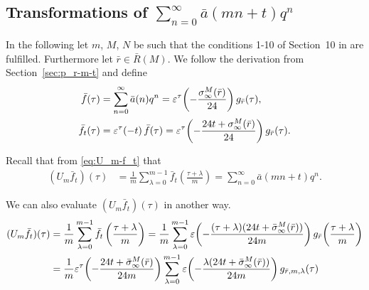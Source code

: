 \documentclass{article}
\begin{document}
\subsection{Transformations of $\sum_{n=0}^\infty \bar{a}(mn+t) q^n$}
\label{sec:p_rbar-m-t}

In the following let $m$, $M$, $N$ be such that the conditions 1-10 of
Section~10 in
\cite{ChenDuZhao_FindingModularFunctionsRamanujan_2019} are
fulfilled.
Furthermore let $\bar{r}\in\bar{R}(M)$.
%
We follow the derivation from Section~\ref{sec:p_r-m-t} and
define
\begin{align*}
  \bar{f}(\tau)
  &=
  \sum_{n=0}^\infty \bar{a}(n) q^n
    =
    \unityPowerTau{-\frac{\sigmainfty[M]{\bar{r}}}{24}} g_{\bar{r}}(\tau),
  \\
  \bar{f}_t(\tau)
  &=
    \unityPowerTau{- t} \bar{f}(\tau)
    =
    \unityPowerTau{-\frac{24t + \sigmainfty[M]{\bar{r}}}{24}} g_{\bar{r}}(\tau).
\end{align*}

Recall that from \eqref{eq:U_m-f_t} that
\begin{align}
  (U_m\bar{f}_t)(\tau)
  &=
  \frac{1}{m} \sum_{\lambda=0}^{m-1}\bar{f}_t\left(\frac{\tau+\lambda}{m}\right)
  =
    \sum_{n=0}^\infty \bar{a}(mn+t) q^n.
  \label{eq:U_m-fbar_t}
\end{align}

We can also evaluate $(U_m\bar{f}_t)(\tau)$ in another way.
%
\begin{align*}
  (U_m\bar{f}_t)(\tau)
  &=
  \frac{1}{m} \sum_{\lambda=0}^{m-1}\bar{f}_t\left(\frac{\tau+\lambda}{m}\right)
    =
    \frac{1}{m} \sum_{\lambda=0}^{m-1}
    \unityPower{-\frac{(\tau+\lambda) (24 t + \sigmainftybar[M]{\bar{r}})}{24 m}}
    g_{\bar{r}}\!\left(\frac{\tau+\lambda}{m}\right)
  \\
  &=
  \frac{1}{m}
  \unityPowerTau{-\frac{24t+\sigmainftybar[M]{\bar{r}}}{24m}}
  \sum_{\lambda=0}^{m-1}
  \unityPower{-\frac{\lambda (24t+\sigmainftybar[M]{\bar{r}})}{24m}}
  g_{\bar{r},m,\lambda}(\tau)
\end{align*}
\end{document}
